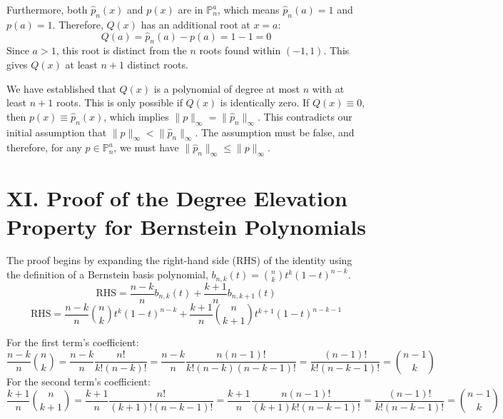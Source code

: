 \documentclass[a4paper]{article}
\begin{document}
Furthermore, both $\hat{p}_n(x)$ and $p(x)$ are in $\mathbb{P}_n^a$, which means $\hat{p}_n(a) = 1$ and $p(a)=1$.
Therefore, $Q(x)$ has an additional root at $x=a$:
\[
Q(a) = \hat{p}_n(a) - p(a) = 1 - 1 = 0
\]
Since $a > 1$, this root is distinct from the $n$ roots found within $(-1,1)$. This gives $Q(x)$ at least $n+1$ distinct roots.

We have established that $Q(x)$ is a polynomial of degree at most $n$ with at least $n+1$ roots. This is only possible if $Q(x)$ is identically zero.
If $Q(x) \equiv 0$, then $p(x) \equiv \hat{p}_n(x)$, which implies $\|p\|_{\infty} = \|\hat{p}_n\|_{\infty}$. This contradicts our initial assumption that $\|p\|_{\infty} < \|\hat{p}_n\|_{\infty}$.
The assumption must be false, and therefore, for any $p \in \mathbb{P}_n^a$, we must have $\|\hat{p}_n\|_{\infty} \le \|p\|_{\infty}$.


\section*{XI. Proof of the Degree Elevation Property for Bernstein Polynomials}

The proof begins by expanding the right-hand side (RHS) of the identity using the definition of a Bernstein basis polynomial, $b_{n,k}(t) = \binom{n}{k}t^k(1-t)^{n-k}$.
\[
\text{RHS} = \frac{n-k}{n}b_{n,k}(t) + \frac{k+1}{n}b_{n,k+1}(t)
\]
\[
\text{RHS} = \frac{n-k}{n}\binom{n}{k}t^k(1-t)^{n-k} + \frac{k+1}{n}\binom{n}{k+1}t^{k+1}(1-t)^{n-k-1}
\]

For the first term's coefficient:
\[
\frac{n-k}{n}\binom{n}{k} = \frac{n-k}{n} \frac{n!}{k!(n-k)!} = \frac{n-k}{n} \frac{n(n-1)!}{k!(n-k)(n-k-1)!} = \frac{(n-1)!}{k!(n-k-1)!} = \binom{n-1}{k}
\]
For the second term's coefficient:
\[
\frac{k+1}{n}\binom{n}{k+1} = \frac{k+1}{n} \frac{n!}{(k+1)!(n-k-1)!} = \frac{k+1}{n} \frac{n(n-1)!}{(k+1)k!(n-k-1)!} = \frac{(n-1)!}{k!(n-k-1)!} = \binom{n-1}{k}
\]
\end{document}
